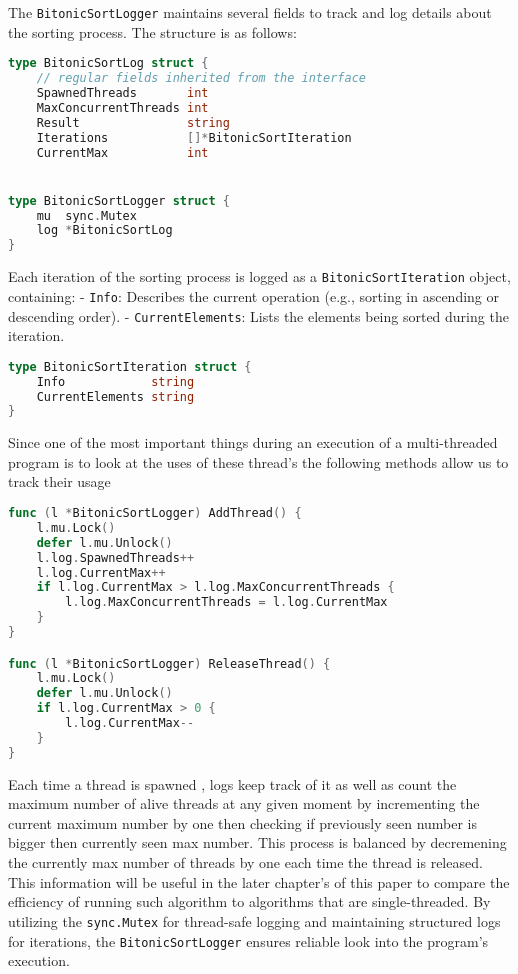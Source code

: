 The \texttt{BitonicSortLogger} maintains several fields to track and log details about the sorting process. The structure is as follows:
\begin{lstlisting}[language=Go]
type BitonicSortLog struct {
	// regular fields inherited from the interface             
	SpawnedThreads       int                          
	MaxConcurrentThreads int                       
	Result               string                  
	Iterations           []*BitonicSortIteration 
	CurrentMax           int                     


type BitonicSortLogger struct {
	mu  sync.Mutex
	log *BitonicSortLog
}
\end{lstlisting}

Each iteration of the sorting process is logged as a \texttt{BitonicSortIteration} object, containing:
- \texttt{Info}: Describes the current operation (e.g., sorting in ascending or descending order).
- \texttt{CurrentElements}: Lists the elements being sorted during the iteration.
\begin{lstlisting}[language=Go]
type BitonicSortIteration struct {
	Info            string  
	CurrentElements string 
}
\end{lstlisting}

Since one of the most important things during an execution of a multi-threaded program is to look at the uses of these thread's the following methods allow us to track their usage
\begin{lstlisting}[language=Go]
func (l *BitonicSortLogger) AddThread() {
	l.mu.Lock()
	defer l.mu.Unlock()
	l.log.SpawnedThreads++
	l.log.CurrentMax++
	if l.log.CurrentMax > l.log.MaxConcurrentThreads {
		l.log.MaxConcurrentThreads = l.log.CurrentMax
	}
}

func (l *BitonicSortLogger) ReleaseThread() {
	l.mu.Lock()
	defer l.mu.Unlock()
	if l.log.CurrentMax > 0 {
		l.log.CurrentMax--
	}
}
\end{lstlisting}
Each time a thread is spawned , logs keep track of it as well as count the maximum number of alive threads at any given moment by incrementing the current maximum number by one then checking if previously seen number is bigger then currently seen max number. This process is balanced by decremening the currently max number of threads by one each time the thread is released. This information will be useful in the later chapter's of this paper to compare the efficiency of running such algorithm to algorithms that are single-threaded.
By utilizing the \texttt{sync.Mutex} for thread-safe logging and maintaining structured logs for iterations, the \texttt{BitonicSortLogger} ensures reliable look into the program's execution.
